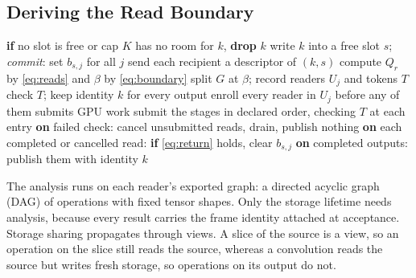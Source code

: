 \documentclass[conference]{IEEEtran}
\begin{document}
\subsection{Deriving the Read Boundary}
\label{sec:derive}

\begin{algorithm}[t]
\caption{BIM's publication and ReadSeal's plan and invocation. $b_{s,j}$: borrow bit of recipient $j$ on slot $s$; $U_j$: readers of $j$; $T$: binding tokens.}
\label{alg:readseal}
\footnotesize
\begin{algorithmic}[1]
\State \textbf{if} no slot is free or cap $K$ has no room for $k$, \textbf{drop} $k$
\State write $k$ into a free slot $s$; \emph{commit}: set $b_{s,j}$ for all $j$
\State send each recipient a descriptor of $(k,s)$
\EndProcedure
{}
\State compute $Q_r$ by \eqref{eq:reads} and $\beta$ by \eqref{eq:boundary}
\State split $G$ at $\beta$; record readers $U_j$ and tokens $T$
\EndProcedure
{}
\State check $T$; keep identity $k$ for every output
\State enroll every reader in $U_j$ before any of them submits GPU work
\State submit the stages in declared order, checking $T$ at each entry
\State \textbf{on} failed check: cancel unsubmitted reads, drain, publish nothing
\State \textbf{on} each completed or cancelled read: \textbf{if} \eqref{eq:return} holds, clear $b_{s,j}$
\State \textbf{on} completed outputs: publish them with identity $k$
\EndProcedure
\end{algorithmic}
\end{algorithm}

The analysis runs on each reader's exported graph: a directed acyclic graph (DAG) of operations with fixed tensor shapes. Only the storage lifetime needs analysis, because every result carries the frame identity attached at acceptance. Storage sharing propagates through views. A slice of the source is a view, so an operation on the slice still reads the source, whereas a convolution reads the source but writes fresh storage, so operations on its output do not.
\end{document}
